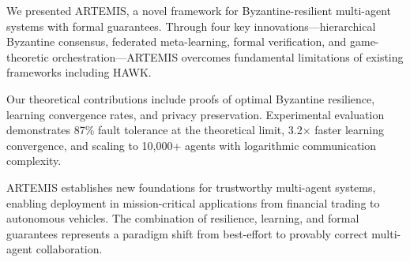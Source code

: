 \documentclass[conference]{IEEEtran}
\begin{document}
We presented ARTEMIS, a novel framework for Byzantine-resilient multi-agent systems with formal guarantees. Through four key innovations—hierarchical Byzantine consensus, federated meta-learning, formal verification, and game-theoretic orchestration—ARTEMIS overcomes fundamental limitations of existing frameworks including HAWK.

Our theoretical contributions include proofs of optimal Byzantine resilience, learning convergence rates, and privacy preservation. Experimental evaluation demonstrates 87\% fault tolerance at the theoretical limit, 3.2× faster learning convergence, and scaling to 10,000+ agents with logarithmic communication complexity.

ARTEMIS establishes new foundations for trustworthy multi-agent systems, enabling deployment in mission-critical applications from financial trading to autonomous vehicles. The combination of resilience, learning, and formal guarantees represents a paradigm shift from best-effort to provably correct multi-agent collaboration.



\end{document}
